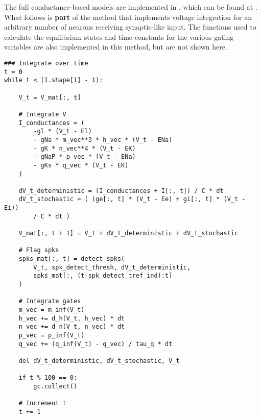 \documentclass[12pt]{article}
\begin{document}
The full conductance-based models are implemented in , which can be found at .
What follows is \textbf{part} of the  method that implements voltage integration for an arbitrary number of neurons receiving synaptic-like input.
The functions used to calculate the equilibrium states and time constants for the various gating variables are also implemented in this method, but are not shown here.

\begin{verbatim}
### Integrate over time
t = 0
while t < (I.shape[1] - 1):

    V_t = V_mat[:, t]

    # Integrate V
    I_conductances = (
        -gl * (V_t - El)
        - gNa * m_vec**3 * h_vec * (V_t - ENa)
        - gK * n_vec**4 * (V_t - EK)
        - gNaP * p_vec * (V_t - ENa)
        - gKs * q_vec * (V_t - EK)
    )

    dV_t_deterministic = (I_conductances + I[:, t]) / C * dt
    dV_t_stochastic = ( (ge[:, t] * (V_t - Ee) + gi[:, t] * (V_t - Ei))
        / C * dt )

    V_mat[:, t + 1] = V_t + dV_t_deterministic + dV_t_stochastic

    # Flag spks
    spks_mat[:, t] = detect_spks(
        V_t, spk_detect_thresh, dV_t_deterministic,
        spks_mat[:, (t-spk_detect_tref_ind):t]
    )

    # Integrate gates
    m_vec = m_inf(V_t)
    h_vec += d_h(V_t, h_vec) * dt
    n_vec += d_n(V_t, n_vec) * dt
    p_vec = p_inf(V_t)
    q_vec += (q_inf(V_t) - q_vec) / tau_q * dt

    del dV_t_deterministic, dV_t_stochastic, V_t

    if t % 100 == 0:
        gc.collect()

    # Increment t
    t += 1
\end{verbatim}
\end{document}
